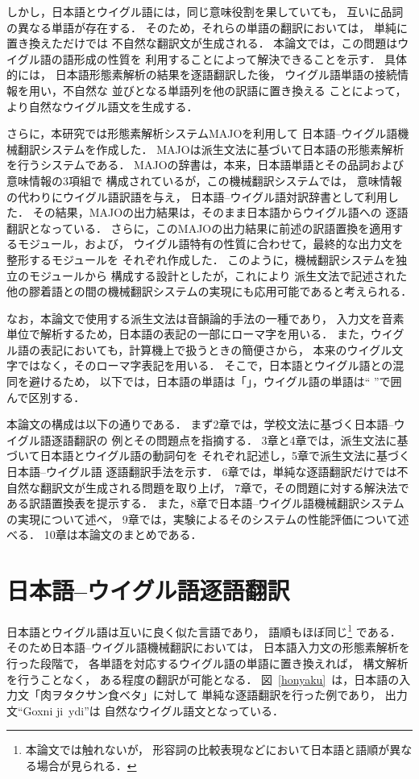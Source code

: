 しかし，日本語とウイグル語には，同じ意味役割を果していても，
互いに品詞の異なる単語が存在する．
そのため，それらの単語の翻訳においては，
単純に置き換えただけでは
不自然な翻訳文が生成される．
本論文では，この問題はウイグル語の語形成の性質を
利用することによって解決できることを示す．
具体的には，
日本語形態素解析の結果を逐語翻訳した後，
ウイグル語単語の接続情報を用い，不自然な
並びとなる単語列を他の訳語に置き換える
ことによって，
より自然なウイグル語文を生成する．

さらに，本研究では形態素解析システムMAJO\cite{OGAWA1999}を利用して
日本語--ウイグル語機械翻訳システムを作成した．
MAJOは派生文法に基づいて日本語の形態素解析を行うシステムである．
MAJOの辞書は，本来，日本語単語とその品詞および意味情報の3項組で
構成されているが，この機械翻訳システムでは，
意味情報の代わりにウイグル語訳語を与え，
日本語--ウイグル語対訳辞書として利用した．
その結果，MAJOの出力結果は，そのまま日本語からウイグル語への
逐語翻訳となっている．
さらに，このMAJOの出力結果に前述の訳語置換を適用するモジュール，および，
ウイグル語特有の性質に合わせて，最終的な出力文を整形するモジュールを
それぞれ作成した．
このように，機械翻訳システムを独立のモジュールから
構成する設計としたが，これにより
派生文法で記述された
他の膠着語との間の機械翻訳システムの実現にも応用可能であると考えられる．

なお，本論文で使用する派生文法は音韻論的手法の一種であり，
入力文を音素単位で解析するため，日本語の表記の一部にローマ字を用いる．
また，ウイグル語の表記においても，計算機上で扱うときの簡便さから，
本来のウイグル文字ではなく，そのローマ字表記を用いる．
そこで，日本語とウイグル語との混同を避けるため，
以下では，日本語の単語は「」，ウイグル語の単語は`` ''で囲んで区別する．

本論文の構成は以下の通りである．
まず2章では，学校文法に基づく日本語--ウイグル語逐語翻訳の
例とその問題点を指摘する．
3章と4章では，派生文法に基づいて日本語とウイグル語の動詞句を
それぞれ記述し，5章で派生文法に基づく日本語--ウイグル語
逐語翻訳手法を示す．
6章では，単純な逐語翻訳だけでは不自然な翻訳文が生成される問題を取り上げ，
7章で，その問題に対する解決法である訳語置換表を提示する．
また，8章で日本語--ウイグル語機械翻訳システム
の実現について述べ，
9章では，実験によるそのシステムの性能評価について述べる．
10章は本論文のまとめである．

\section{日本語--ウイグル語逐語翻訳}
日本語とウイグル語は互いに良く似た言語であり，
語順もほぼ同じ\footnote{本論文では触れないが，
形容詞の比較表現などにおいて日本語と語順が異なる場合が見られる．}
である．
そのため日本語--ウイグル語機械翻訳においては，
日本語入力文の形態素解析を行った段階で，
各単語を対応するウイグル語の単語に置き換えれば，
構文解析を行うことなく，
ある程度の翻訳が可能となる．
図~\ref{honyaku}~は，日本語の入力文「肉ヲタクサン食ベタ」に対して
単純な逐語翻訳を行った例であり，
出力文``Goxni ji\mk \ y\me di''は
自然なウイグル語文となっている．

